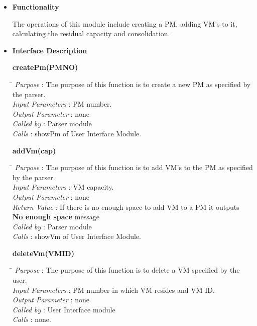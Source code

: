 \documentclass[a4paper,11pt]{article}
\begin{document}
\begin{itemize}
\item \textbf{Functionality}

The operations of this module include creating a PM, adding VM's to it, calculating the residual capacity and consolidation.

\item \textbf{Interface Description} 

\textbf{createPm(PM\textunderscore NO)}
  
\begin{tabbing}
\hspace*{4cm}\=  \kill
 \textit{Purpose} \> : The purpose of this function is to create a new PM as specified by\\ \> the parser.\\
  \textit{Input Parameters} \> : PM number. \\
  \textit{Output Parameter} \> : none \\
  \textit{Called by} \> : Parser module \\
  \textit{Calls} \> : showPm of User Interface Module.
\end{tabbing}
\pagebreak
\textbf{addVm(cap)}
  
\begin{tabbing}
\hspace*{4cm}\=  \kill
 \textit{Purpose} \> : The purpose of this function is to add VM's to the PM as specified\\ \> by the parser.\\
  \textit{Input Parameters} \> : VM capacity. \\
  \textit{Output Parameter} \> : none \\
  \textit{Return Value} \> : If there is no enough space to add VM to a PM it outputs \\ \>\textbf{No enough space} message\\
  \textit{Called by} \> : Parser module \\
  \textit{Calls} \> : showVm of User Interface Module.
\end{tabbing}

\textbf{deleteVm(VM\textunderscore ID)}
  
\begin{tabbing}
\hspace*{4cm}\=  \kill
 \textit{Purpose} \> : The purpose of this function is to delete a VM specified by the user.\\
  \textit{Input Parameters} \> : PM number in which VM resides and VM ID. \\
  \textit{Output Parameter} \> : none \\
 \textit{Called by} \> : User Interface module \\
  \textit{Calls} \> : none.
\end{tabbing}


\end{itemize}
\end{document}

